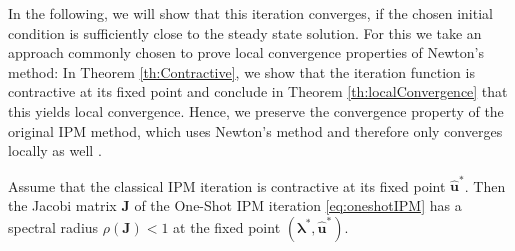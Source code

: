 In the following, we will show that this iteration converges, if the chosen initial condition is sufficiently close to the steady state solution. For this we take an approach commonly chosen to prove local convergence properties of Newton's method: In Theorem \ref{th:Contractive}, we show that the iteration function is contractive at its fixed point and conclude in Theorem \ref{th:localConvergence} that this yields local convergence. Hence, we preserve the convergence property of the original IPM method, which uses Newton's method and therefore only converges locally as well .
\begin{theorem}\label{th:Contractive}
Assume that the classical IPM iteration is contractive at its fixed point $\bm{\hat u}^*$. Then the Jacobi matrix $\bm{J}$ of the One-Shot IPM iteration \eqref{eq:oneshotIPM} has a spectral radius $\rho(\bm{J})<1$ at the fixed point $(\bm{\lambda}^*,\bm{\hat u}^*)$.
\end{theorem}
